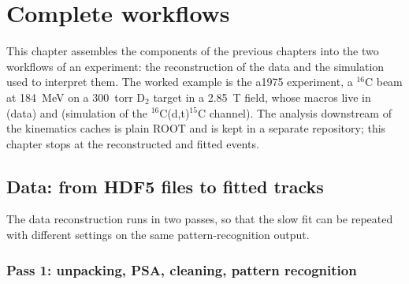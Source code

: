 \chapter{Complete workflows}
\label{ch:workflows}

This chapter assembles the components of the previous chapters into the two workflows of an experiment: the
reconstruction of the data and the simulation used to interpret them. The worked example is the a1975 experiment, a
$^{16}$C beam at 184~MeV on a 300~torr D$_2$ target in a 2.85~T field, whose macros live in
 (data) and  (simulation of the
$^{16}$C(d,t)$^{15}$C channel). The analysis downstream of the kinematics caches is plain ROOT and is kept in a
separate repository; this chapter stops at the reconstructed and fitted events.

\section{Data: from HDF5 files to fitted tracks}

The data reconstruction runs in two passes, so that the slow fit can be repeated with different settings on the same
pattern-recognition output.

\subsection{Pass 1: unpacking, PSA, cleaning, pattern recognition}

